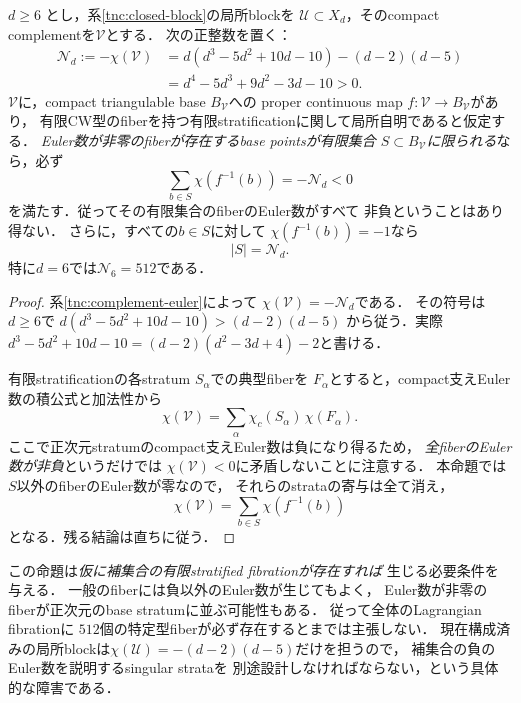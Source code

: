 \begin{proposition}
\label{tnc:complement-singularity-budget}
$d\ge6$ とし，系\ref{tnc:closed-block}の局所blockを
$\mathcal U\subset X_d$，そのcompact complementを$\mathcal V$とする．
次の正整数を置く：
\[
 \begin{split}
 \mathcal N_d:=-\chi(\mathcal V)
  &=d(d^3-5d^2+10d-10)-(d-2)(d-5)\\
  &=d^4-5d^3+9d^2-3d-10>0.
 \end{split}
\]
$\mathcal V$に，compact triangulable base $B_{\mathcal V}$への
proper continuous map
$f:\mathcal V\to B_{\mathcal V}$があり，
有限CW型のfiberを持つ有限stratificationに関して局所自明であると仮定する．
\emph{Euler数が非零のfiberが存在するbase pointsが有限集合
$S\subset B_{\mathcal V}$に限られる}なら，必ず
\[
 \boxed{\sum_{b\in S}\chi(f^{-1}(b))=-\mathcal N_d<0}
\]
を満たす．従ってその有限集合のfiberのEuler数がすべて
非負ということはあり得ない．
さらに，すべての$b\in S$に対して
$\chi(f^{-1}(b))=-1$なら
\[
 \boxed{|S|=\mathcal N_d}.
\]
特に$d=6$では$\mathcal N_6=512$である．
\end{proposition}
\begin{proof}
系\ref{tnc:complement-euler}によって
$\chi(\mathcal V)=-\mathcal N_d$である．
その符号は$d\ge6$で
$d(d^3-5d^2+10d-10)>(d-2)(d-5)$
から従う．実際
$d^3-5d^2+10d-10=
(d-2)(d^2-3d+4)-2$と書ける．

有限stratificationの各stratum $S_\alpha$での典型fiberを
$F_\alpha$とすると，compact支えEuler数の積公式と加法性から
\[
 \chi(\mathcal V)
   =\sum_\alpha
       \chi_c(S_\alpha)\,\chi(F_\alpha).
\]
ここで正次元stratumのcompact支えEuler数は負になり得るため，
\emph{全fiberのEuler数が非負}というだけでは
$\chi(\mathcal V)<0$に矛盾しないことに注意する．
本命題では$S$以外のfiberのEuler数が零なので，
それらのstrataの寄与は全て消え，
\[
 \chi(\mathcal V)=\sum_{b\in S}\chi(f^{-1}(b))
\]
となる．残る結論は直ちに従う．
\end{proof}

\begin{remark}[適用範囲と実際の課題]
この命題は\emph{仮に補集合の有限stratified fibrationが存在すれば}
生じる必要条件を与える．
一般のfiberには負以外のEuler数が生じてもよく，
Euler数が非零のfiberが正次元のbase stratumに並ぶ可能性もある．
従って全体のLagrangian fibrationに
$512$個の特定型fiberが必ず存在するとまでは主張しない．
現在構成済みの局所blockは$\chi(\mathcal U)=-(d-2)(d-5)$だけを担うので，
補集合の負のEuler数を説明するsingular strataを
別途設計しなければならない，という具体的な障害である．
\end{remark}

